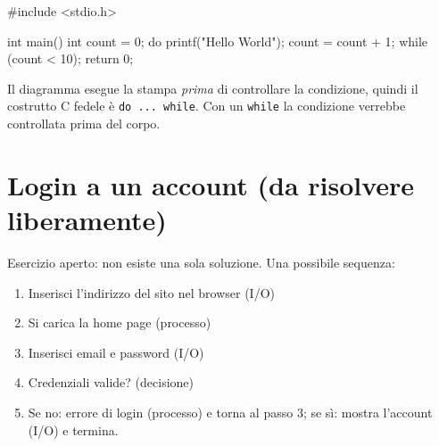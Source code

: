 \documentclass[11pt,a4paper]{article}
\begin{document}
\begin{codice}
#include <stdio.h>

int main() {
    int count = 0;
    do {
        printf("Hello World\n");
        count = count + 1;
    } while (count < 10);
    return 0;
}
\end{codice}

\begin{osservazione}
Il diagramma esegue la stampa \emph{prima} di controllare la condizione, quindi
il costrutto C fedele è \lstinline|do ... while|. Con un \lstinline|while|
la condizione verrebbe controllata prima del corpo.
\end{osservazione}

\section{Login a un account (da risolvere liberamente)}

Esercizio aperto: non esiste una sola soluzione. Una possibile sequenza:
\begin{enumerate}
    \item Inserisci l'indirizzo del sito nel browser (I/O)
    \item Si carica la home page (processo)
    \item Inserisci email e password (I/O)
    \item Credenziali valide? (decisione)
    \item Se no: errore di login (processo) e torna al passo 3;
          se sì: mostra l'account (I/O) e termina.
\end{enumerate}

\begin{center}
\end{center}
\end{document}
